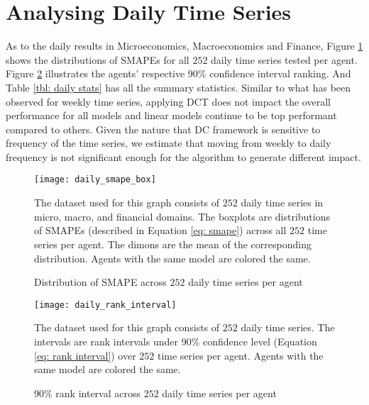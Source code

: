 \section{Analysing Daily Time Series}
As to the daily results in Microeconomics, Macroeconomics and Finance, Figure \ref{fig: daily smape box} shows the distributions of SMAPEs for all $252$ daily time series tested per agent. Figure \ref{fig: daily rank interval} illustrates the agents' respective 90\% confidence interval ranking. And Table \ref{tbl: daily stats} has all the summary statistics. Similar to what has been observed for weekly time series, applying DCT does not impact the overall performance for all models and linear models continue to be top performant compared to others. Given the nature that DC framework is sensitive to frequency of the time series, we estimate that moving from weekly to daily frequency is not significant enough for the algorithm to generate different impact.
\begin{figure}[H]
    \centering
    \texttt{[image: daily\_smape\_box]}
    \caption{Distribution of SMAPE across $252$ daily time series per agent}
    {\raggedright \footnotesize The dataset used for this graph consists of $252$ daily time series in micro, macro, and financial domains. The boxplots are distributions of SMAPEs (described in Equation \ref{eq: smape}) across all $252$ time series per agent. The dimons are the mean of the corresponding distribution. Agents with the same model are colored the same. \par}
    \label{fig: daily smape box}
\end{figure}
\begin{figure}[H]
    \centering
    \texttt{[image: daily\_rank\_interval]}
    \caption{90\% rank interval across $252$ daily time series per agent}
    {\raggedright \footnotesize The dataset used for this graph consists of $252$ daily time series. The intervals are rank intervals under 90\% confidence level (Equation \ref{eq: rank interval}) over $252$ time series per agent. Agents with the same model are colored the same. \par}
    \label{fig: daily rank interval}
\end{figure}
